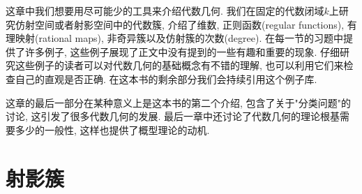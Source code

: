 这章中我们想要用尽可能少的工具来介绍代数几何. 我们在固定的代数闭域$k$上研究仿射空间或者射影空间中的代数簇, 介绍了维数, 正则函数(regular functions), 有理映射(rational maps), 非奇异簇以及仿射簇的次数(degree). 在每一节的习题中提供了许多例子, 这些例子展现了正文中没有提到的一些有趣和重要的现象. 仔细研究这些例子的读者可以对代数几何的基础概念有不错的理解, 也可以利用它们来检查自己的直观是否正确. 在这本书的剩余部分我们会持续引用这个例子库.

这章的最后一部分在某种意义上是这本书的第二个介绍, 包含了关于"分类问题"的讨论, 这引发了很多代数几何的发展. 最后一章中还讨论了代数几何的理论根基需要多少的一般性, 这样也提供了概型理论的动机.

\setcounter{section}{1}
\section{射影簇}


